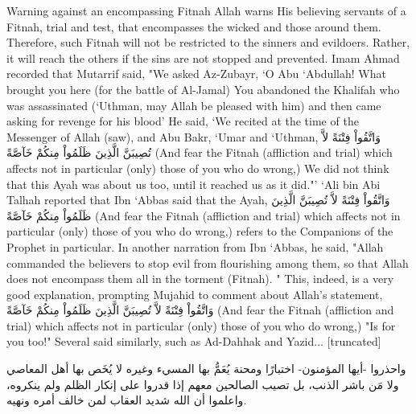 \documentclass[11pt,a4paper,openany]{book}
\let\textAR\textarabic
\begin{document}
\begin{tafsirbox}
Warning against an encompassing Fitnah Allah warns His believing servants of a Fitnah, trial and test, that encompasses the wicked and those around them. Therefore, such Fitnah will not be restricted to the sinners and evildoers. Rather, it will reach the others if the sins are not stopped and prevented. Imam Ahmad recorded that Mutarrif said, "We asked Az-Zubayr, `O Abu `Abdullah! What brought you here (for the battle of Al-Jamal) You abandoned the Khalifah who was assassinated (`Uthman, may Allah be pleased with him) and then came asking for revenge for his blood' He said, `We recited at the time of the Messenger of Allah (saw), and Abu Bakr, `Umar and `Uthman, \textAR{وَاتَّقُواْ} \textAR{فِتْنَةً} \textAR{لاَّ} \textAR{تُصِيبَنَّ} \textAR{الَّذِينَ} \textAR{ظَلَمُواْ} \textAR{مِنكُمْ} \textAR{خَآصَّةً} (And fear the Fitnah (affliction and trial) which affects not in particular (only) those of you who do wrong,) We did not think that this Ayah was about us too, until it reached us as it did."' `Ali bin Abi Talhah reported that Ibn `Abbas said that the Ayah, \textAR{وَاتَّقُواْ} \textAR{فِتْنَةً} \textAR{لاَّ} \textAR{تُصِيبَنَّ} \textAR{الَّذِينَ} \textAR{ظَلَمُواْ} \textAR{مِنكُمْ} \textAR{خَآصَّةً} (And fear the Fitnah (affliction and trial) which affects not in particular (only) those of you who do wrong,) refers to the Companions of the Prophet in particular. In another narration from Ibn `Abbas, he said, "Allah commanded the believers to stop evil from flourishing among them, so that Allah does not encompass them all in the torment (Fitnah). " This, indeed, is a very good explanation, prompting Mujahid to comment about Allah's statement, \textAR{وَاتَّقُواْ} \textAR{فِتْنَةً} \textAR{لاَّ} \textAR{تُصِيبَنَّ} \textAR{الَّذِينَ} \textAR{ظَلَمُواْ} \textAR{مِنكُمْ} \textAR{خَآصَّةً} (And fear the Fitnah (affliction and trial) which affects not in particular (only) those of you who do wrong,) "Is for you too!" Several said similarly, such as Ad-Dahhak and Yazid... [truncated]
\end{tafsirbox}


\begin{muyassarbox}
\textAR{واحذروا -أيها المؤمنون- اختبارًا ومحنة يُعَمُّ بها المسيء وغيره لا يُخَص بها أهل المعاصي ولا مَن باشر الذنب، بل تصيب الصالحين معهم إذا قدروا على إنكار الظلم ولم ينكروه، واعلموا أن الله شديد العقاب لمن خالف أمره ونهيه.}
\end{muyassarbox}
\end{document}
